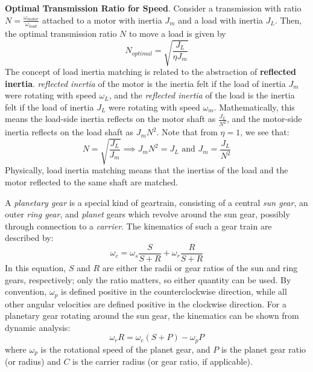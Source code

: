 \begin{shaded}
    \textbf{Optimal Transmission Ratio for Speed}. Consider a transmission with ratio $N=\frac{\omega_{motor}}{\omega_{load}}$ attached to a motor with inertia $J_m$ and a load with inertia $J_L$. Then, the optimal transmission ratio $N$ to move a load is given by \[N_{optimal}=\sqrt{\frac{J_L}{\eta J_m}}\tag{Load Inertia Matching}\] The concept of load inertia matching is related to the abstraction of \textbf{reflected inertia}. \textit{reflected inertia} of the motor is the inertia felt if the load of inertia $J_m$ were rotating with speed $\omega_L$, and the \textit{reflected inertia} of the load is the inertia felt if the load of inertia $J_L$ were rotating with speed $\omega_m$. Mathematically, this means the load-side inertia reflects on the motor shaft as $\frac{J_L}{N^2}$, and the motor-side inertia reflects on the load shaft as $J_mN^2$. Note that from $\eta=1$, we see that: \[N = \sqrt{\frac{J_L}{J_m}} \implies J_m N^2 = J_L \text{ and } J_m = \frac{J_L}{N^2}\] Physically, load inertia matching means that the inertias of the load and the motor reflected to the same shaft are matched.
\end{shaded}


A \textit{planetary gear} is a special kind of geartrain, consisting of a central \textit{sun gear}, an outer \textit{ring gear}, and \textit{planet} gears which revolve around the sun gear, possibly through connection to a \textit{carrier}. The kinematics of such a gear train are described by:
\[\omega_c = \omega_s \frac{S}{S+R} + \omega_r \frac{R}{S+R}\tag{Planetary Gear Kinematics}\] In this equation, $S$ and $R$ are either the radii or gear ratios of the sun and ring gears, respectively; only the ratio matters, so either quantity can be used. By convention, $\omega_p$ is defined positive in the counterclockwise direction, while all other angular velocities are defined positive in the clockwise direction. For a planetary gear rotating around the sun gear, the kinematics can be shown from dynamic analysis: \[\omega_r R = \omega_c (S+P) - \omega_p P\] where $\omega_p$ is the rotational speed of the planet gear, and $P$ is the planet gear ratio (or radius) and $C$ is the carrier radius (or gear ratio, if applicable).




